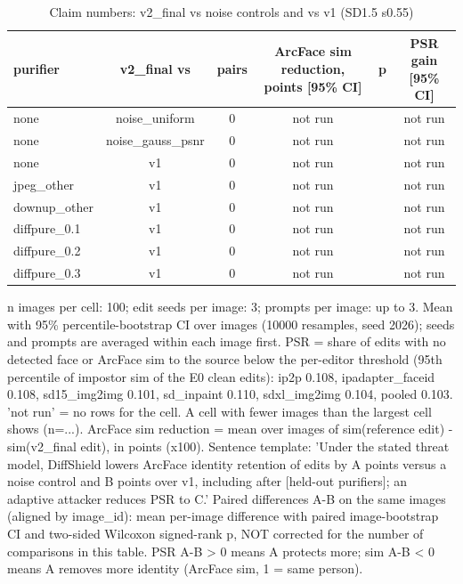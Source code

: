 \begin{table}[t]
\centering
\small
\begin{tabular}{lccccc}
\toprule
purifier & v2\_final vs & pairs & ArcFace sim reduction, points [95\% CI] & p & PSR gain [95\% CI] \\
\midrule
none & noise\_uniform & 0 & not run &  & not run \\
none & noise\_gauss\_psnr & 0 & not run &  & not run \\
none & v1 & 0 & not run &  & not run \\
jpeg\_other & v1 & 0 & not run &  & not run \\
downup\_other & v1 & 0 & not run &  & not run \\
diffpure\_0.1 & v1 & 0 & not run &  & not run \\
diffpure\_0.2 & v1 & 0 & not run &  & not run \\
diffpure\_0.3 & v1 & 0 & not run &  & not run \\
\bottomrule
\end{tabular}
\caption{Claim numbers: v2\_final vs noise controls and vs v1 (SD1.5 s0.55)}
\label{tab:claims}
\par\footnotesize n images per cell: 100; edit seeds per image: 3; prompts per image: up to 3. Mean with 95\% percentile-bootstrap CI over images (10000 resamples, seed 2026); seeds and prompts are averaged within each image first. PSR = share of edits with no detected face or ArcFace sim to the source below the per-editor threshold (95th percentile of impostor sim of the E0 clean edits): ip2p 0.108, ipadapter\_faceid 0.108, sd15\_img2img 0.101, sd\_inpaint 0.110, sdxl\_img2img 0.104, pooled 0.103. 'not run' = no rows for the cell. A cell with fewer images than the largest cell shows (n=...). ArcFace sim reduction = mean over images of sim(reference edit) - sim(v2\_final edit), in points (x100). Sentence template: 'Under the stated threat model, DiffShield lowers ArcFace identity retention of edits by A points versus a noise control and B points over v1, including after [held-out purifiers]; an adaptive attacker reduces PSR to C.' Paired differences A-B on the same images (aligned by image\_id): mean per-image difference with paired image-bootstrap CI and two-sided Wilcoxon signed-rank p, NOT corrected for the number of comparisons in this table. PSR A-B > 0 means A protects more; sim A-B < 0 means A removes more identity (ArcFace sim, 1 = same person).
\end{table}
